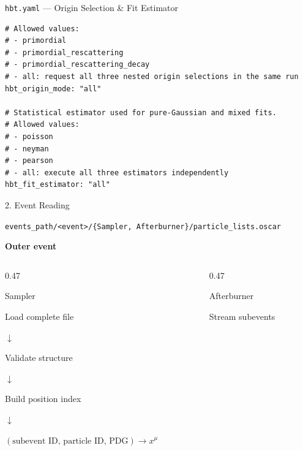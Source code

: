 \documentclass{beamer}
\begin{document}
\begin{frame}[fragile]{\texttt{hbt.yaml} --- Origin Selection \& Fit Estimator}
\vspace{-0.5em}
\scriptsize
\begin{verbatim}
# Allowed values:
# - primordial
# - primordial_rescattering
# - primordial_rescattering_decay
# - all: request all three nested origin selections in the same run
hbt_origin_mode: "all"

# Statistical estimator used for pure-Gaussian and mixed fits.
# Allowed values:
# - poisson
# - neyman
# - pearson
# - all: execute all three estimators independently
hbt_fit_estimator: "all"
\end{verbatim}
\end{frame}


\begin{frame}{2. Event Reading}
\small

\begin{center}
\scriptsize
\texttt{events\_path/<event>/\{Sampler, Afterburner\}/particle\_lists.oscar}
\end{center}

\vspace{-0.2em}
\begin{center}
\textbf{Outer event}
\end{center}
\vspace{-0.7em}

\begin{columns}[T]

\begin{column}{0.47\textwidth}
\begin{block}{Sampler}
\begin{center}
Load complete file

$\downarrow$

Validate structure

$\downarrow$

Build position index

$\downarrow$

\scriptsize
$(\text{subevent ID},\,\text{particle ID},\,\text{PDG})\rightarrow x^\mu$
\end{center}
\end{block}
\end{column}

\begin{column}{0.47\textwidth}
\begin{block}{Afterburner}
\begin{center}
Stream subevents


\end{center}
\end{block}
\end{column}
\end{columns}
\end{frame}
\end{document}
